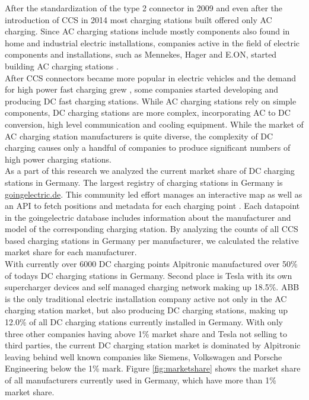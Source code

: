 \documentclass[conference,flushend]{iaria} %
\begin{document}
After the standardization of the type 2 connector in 2009 and even after the introduction of CCS in 2014 most charging stations built offered only AC charging.
Since AC charging stations include mostly components also found in home and industrial electric installations, companies active in the field of electric components and installations, such as Mennekes, Hager and E.ON, started building AC charging stations \cite{dalheimer_ladeinfrastruktur_2017}. \\
After CCS connectors became more popular in electric vehicles and the demand for high power fast charging grew \cite{das_electric_2020}, some companies started developing and producing DC fast charging stations.
While AC charging stations rely on simple components, DC charging stations are more complex, incorporating AC to DC conversion, high level communication and cooling equipment.
While the market of AC charging station manufacturers is quite diverse, the complexity of DC charging causes only a handful of companies to produce significant numbers of high power charging stations. \\
As a part of this research we analyzed the current market share of DC charging stations in Germany.
The largest registry of charging stations in Germany is \url{goingelectric.de}. This community led effort manages an interactive map as well as an API to fetch positions and metadata for each charging point \cite{noauthor_dokumentation_nodate}.
Each datapoint in the goingelectric database includes information about the manufacturer and model of the corresponding charging station.
By analyzing the counts of all CCS based charging stations in Germany per manufacturer, we calculated the relative market share for each manufacturer. \\ 
With currently over 6000 DC charging points Alpitronic manufactured over 50\% of todays DC charging stations in Germany.
Second place is Tesla with its own supercharger devices and self managed charging network making up 18.5\%.
ABB is the only traditional electric installation company active not only in the AC charging station market, but also producing DC charging stations, making up 12.0\% of all DC charging stations currently installed in Germany.
With only three other companies having above 1\% market share and Tesla not selling to third parties, the current DC charging station market is dominated by Alpitronic leaving behind well known companies like Siemens, Volkswagen and Porsche Engineering below the 1\% mark.
Figure \ref{fig:marketshare} shows the market share of all manufacturers currently used in Germany, which have more than 1\% market share.
\end{document}

